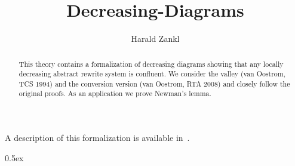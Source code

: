 \documentclass[11pt,a4paper]{article}
\begin{document}
\title{Decreasing-Diagrams}
\author{Harald Zankl}
\maketitle

\begin{abstract}
This theory contains a formalization of decreasing diagrams showing that any
locally decreasing abstract rewrite system is confluent. We consider the valley
(van Oostrom, TCS 1994) and the conversion version (van Oostrom, RTA 2008) and
closely follow the original proofs. As an application we prove Newman's lemma.
\end{abstract}

A description of this formalization is available in~\cite{Z13}.
\tableofcontents

\parindent 0pt\parskip 0.5ex





\end{document}
